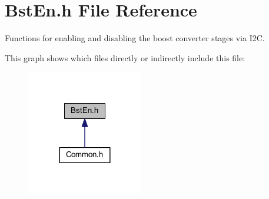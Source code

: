 \hypertarget{a00008}{\section{Bst\-En.\-h File Reference}
\label{a00008}
}


Functions for enabling and disabling the boost converter stages via I2\-C.  


This graph shows which files directly or indirectly include this file\-:
\nopagebreak
\begin{figure}[H]
\begin{center}
\leavevmode
\includegraphics[width=144pt]{a00045}
\end{center}
\end{figure}
